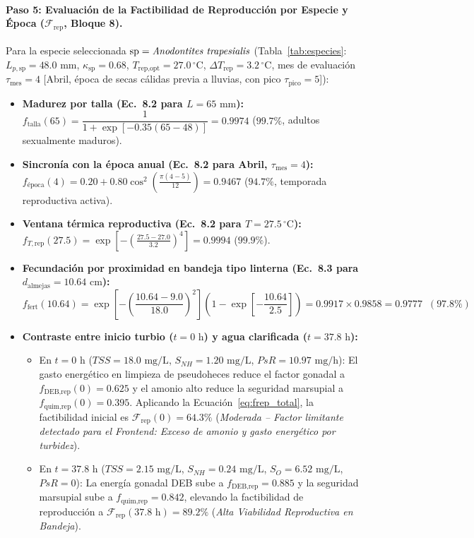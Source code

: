 \documentclass[11pt,letterpaper]{article}
\begin{document}
\paragraph{Paso 5: Evaluación de la Factibilidad de Reproducción por Especie y Época ($\mathcal{F}_{\text{rep}}$, Bloque 8).}
Para la especie seleccionada $\text{sp} = \text{\textit{Anodontites trapesialis}}$ (Tabla~\ref{tab:especies}: $L_{p,\text{sp}} = 48.0\text{ mm}$, $\kappa_{\text{sp}} = 0.68$, $T_{\text{rep,opt}} = 27.0\,^\circ\text{C}$, $\Delta T_{\text{rep}} = 3.2\,^\circ\text{C}$, mes de evaluación $\tau_{\text{mes}} = 4$ [Abril, época de secas cálidas previa a lluvias, con pico $\tau_{\text{pico}} = 5$]):
\begin{itemize}[leftmargin=1.5em,noitemsep]
    \item \textbf{Madurez por talla (Ec.\ 8.2 para $L=65\text{ mm}$):} $f_{\text{talla}}(65) = \dfrac{1}{1 + \exp[-0.35(65 - 48)]} = \mathbf{0.9974}$ ($99.7\%$, adultos sexualmente maduros).
    \item \textbf{Sincronía con la época anual (Ec.\ 8.2 para Abril, $\tau_{\text{mes}}=4$):} $f_{\text{época}}(4) = 0.20 + 0.80\cos^2\!\left(\frac{\pi(4-5)}{12}\right) = \mathbf{0.9467}$ ($94.7\%$, temporada reproductiva activa).
    \item \textbf{Ventana térmica reproductiva (Ec.\ 8.2 para $T=27.5\,^\circ\text{C}$):} $f_{T,\text{rep}}(27.5) = \exp\!\left[-\left(\frac{27.5 - 27.0}{3.2}\right)^4\right] = \mathbf{0.9994}$ ($99.9\%$).
    \item \textbf{Fecundación por proximidad en bandeja tipo linterna (Ec.\ 8.3 para $d_{\text{almejas}}=10.64\text{ cm}$):}
    \[
        f_{\text{fert}}(10.64) = \exp\!\left[-\left(\frac{10.64 - 9.0}{18.0}\right)^2\right]\left(1 - \exp\!\left[-\frac{10.64}{2.5}\right]\right) = 0.9917 \times 0.9858 = \mathbf{0.9777} \;\; (97.8\%)
    \]
    \item \textbf{Contraste entre inicio turbio ($t=0\text{ h}$) y agua clarificada ($t=37.8\text{ h}$):}
    \begin{itemize}
        \item En $t=0\text{ h}$ ($TSS=18.0\text{ mg/L}$, $S_{NH}=1.20\text{ mg/L}$, $PsR=10.97\text{ mg/h}$): El gasto energético en limpieza de pseudoheces reduce el factor gonadal a $f_{\text{DEB,rep}}(0) = 0.625$ y el amonio alto reduce la seguridad marsupial a $f_{\text{quim,rep}}(0) = 0.395$. Aplicando la Ecuación~\eqref{eq:frep_total}, la factibilidad inicial es $\mathcal{F}_{\text{rep}}(0) = \mathbf{64.3\%}$ (\textit{Moderada -- Factor limitante detectado para el Frontend: Exceso de amonio y gasto energético por turbidez}).
        \item En $t=37.8\text{ h}$ ($TSS=2.15\text{ mg/L}$, $S_{NH}=0.24\text{ mg/L}$, $S_O=6.52\text{ mg/L}$, $PsR=0$): La energía gonadal DEB sube a $f_{\text{DEB,rep}} = 0.885$ y la seguridad marsupial sube a $f_{\text{quim,rep}} = 0.842$, elevando la factibilidad de reproducción a $\mathcal{F}_{\text{rep}}(37.8\text{ h}) = \mathbf{89.2\%}$ (\textit{Alta Viabilidad Reproductiva en Bandeja}).
    \end{itemize}
\end{itemize}
\end{document}
